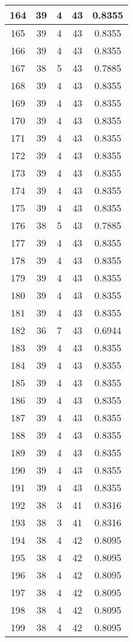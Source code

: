 \documentclass[letterpaper, 12pt]{article}
\begin{document}
\begin{longtable}{|c|c|c|c|c|}
\hline
164 & 39 & 4 & 43 & 0.8355 \\
\hline
165 & 39 & 4 & 43 & 0.8355 \\
\hline
166 & 39 & 4 & 43 & 0.8355 \\
\hline
167 & 38 & 5 & 43 & 0.7885 \\
\hline
168 & 39 & 4 & 43 & 0.8355 \\
\hline
169 & 39 & 4 & 43 & 0.8355 \\
\hline
170 & 39 & 4 & 43 & 0.8355 \\
\hline
171 & 39 & 4 & 43 & 0.8355 \\
\hline
172 & 39 & 4 & 43 & 0.8355 \\
\hline
173 & 39 & 4 & 43 & 0.8355 \\
\hline
174 & 39 & 4 & 43 & 0.8355 \\
\hline
175 & 39 & 4 & 43 & 0.8355 \\
\hline
176 & 38 & 5 & 43 & 0.7885 \\
\hline
177 & 39 & 4 & 43 & 0.8355 \\
\hline
178 & 39 & 4 & 43 & 0.8355 \\
\hline
179 & 39 & 4 & 43 & 0.8355 \\
\hline
180 & 39 & 4 & 43 & 0.8355 \\
\hline
181 & 39 & 4 & 43 & 0.8355 \\
\hline
182 & 36 & 7 & 43 & 0.6944 \\
\hline
183 & 39 & 4 & 43 & 0.8355 \\
\hline
184 & 39 & 4 & 43 & 0.8355 \\
\hline
185 & 39 & 4 & 43 & 0.8355 \\
\hline
186 & 39 & 4 & 43 & 0.8355 \\
\hline
187 & 39 & 4 & 43 & 0.8355 \\
\hline
188 & 39 & 4 & 43 & 0.8355 \\
\hline
189 & 39 & 4 & 43 & 0.8355 \\
\hline
190 & 39 & 4 & 43 & 0.8355 \\
\hline
191 & 39 & 4 & 43 & 0.8355 \\
\hline
192 & 38 & 3 & 41 & 0.8316 \\
\hline
193 & 38 & 3 & 41 & 0.8316 \\
\hline
194 & 38 & 4 & 42 & 0.8095 \\
\hline
195 & 38 & 4 & 42 & 0.8095 \\
\hline
196 & 38 & 4 & 42 & 0.8095 \\
\hline
197 & 38 & 4 & 42 & 0.8095 \\
\hline
198 & 38 & 4 & 42 & 0.8095 \\
\hline
199 & 38 & 4 & 42 & 0.8095 \\
\hline
\end{longtable}
\end{document}
